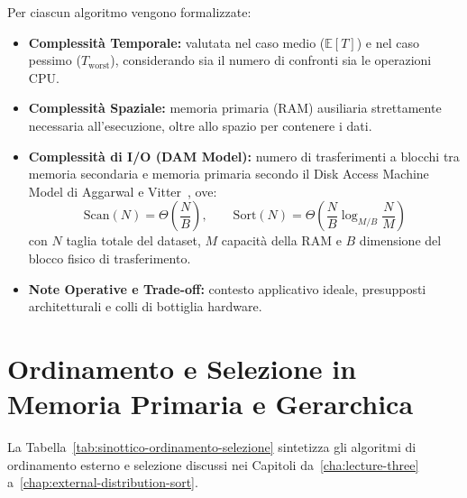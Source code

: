 Per ciascun algoritmo vengono formalizzate:
\begin{itemize}
  \item \textbf{Complessit\`a Temporale:} valutata nel caso medio ($\mathbb{E}[T]$) e nel caso pessimo ($T_{\text{worst}}$), considerando sia il numero di confronti sia le operazioni CPU.
  \item \textbf{Complessit\`a Spaziale:} memoria primaria (RAM) ausiliaria strettamente necessaria all'esecuzione, oltre allo spazio per contenere i dati.
  \item \textbf{Complessit\`a di I/O (DAM Model):} numero di trasferimenti a blocchi tra memoria secondaria e memoria primaria secondo il Disk Access Machine Model di Aggarwal e Vitter~\cite{aggarwal1988}, ove:
  \begin{equation}
    \text{Scan}(N) = \Theta\left(\frac{N}{B}\right), \qquad \text{Sort}(N) = \Theta\left(\frac{N}{B} \log_{M/B} \frac{N}{M}\right)
  \end{equation}
  con $N$ taglia totale del dataset, $M$ capacit\`a della RAM e $B$ dimensione del blocco fisico di trasferimento.
  \item \textbf{Note Operative e Trade-off:} contesto applicativo ideale, presupposti architetturali e colli di bottiglia hardware.
\end{itemize}

\FloatBarrier
\section{Ordinamento e Selezione in Memoria Primaria e Gerarchica}
\label{sec:sinottico-ordinamento-selezione}

La Tabella~\ref{tab:sinottico-ordinamento-selezione} sintetizza gli algoritmi di ordinamento esterno e selezione discussi nei Capitoli da~\ref{cha:lecture-three} a~\ref{chap:external-distribution-sort}.

